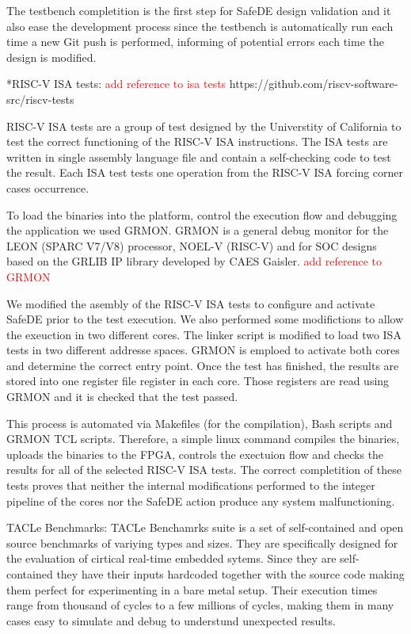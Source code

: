 The testbench completition is the first step for SafeDE design validation and it also ease the development process since the testbench is automatically run each time a new Git push is performed, informing of potential errors each time the design is modified.


*RISC-V ISA tests:
\textcolor{red}{add reference to isa tests} https://github.com/riscv-software-src/riscv-tests

RISC-V ISA tests are a group of test designed by the Universtity of California to test the correct functioning of the RISC-V ISA instructions. The ISA tests are written in single assembly language file and contain a self-checking code to test the result. Each ISA test tests one operation from the RISC-V ISA forcing corner cases occurrence. 

To load the binaries into the platform, control the execution flow and debugging the application we used GRMON. GRMON is a general debug monitor for the LEON (SPARC V7/V8) processor, NOEL-V (RISC-V) and for SOC designs based on the GRLIB IP library developed by CAES Gaisler. 
\textcolor{red}{add reference to GRMON} 

We modified the asembly of the RISC-V ISA tests to configure and activate SafeDE prior to the test execution. We also performed some modifictions to allow the exeuction in two different cores. The linker script is modified to load two ISA tests in two different addresse spaces. GRMON is emploed to activate both cores and determine the correct entry point. Once the test has finished, the results are stored into one register file register in each core. Those registers are read using GRMON and it is checked that the test passed. 

This process is automated via Makefiles (for the compilation), Bash scripts and GRMON TCL scripts. Therefore, a simple linux command compiles the binaries, uploads the binaries to the FPGA, controls the exectuion flow and checks the results for all of the selected RISC-V ISA tests. The correct completition of these tests proves that neither the internal modifications performed to the integer pipeline of the cores nor the SafeDE action produce any system malfunctioning.

TACLe Benchmarks:
TACLe Benchamrks suite is a set of self-contained and open source benchmarks of variying types and sizes. They are specifically designed for the evaluation of cirtical real-time embedded sytems. Since they are self-contained they have their inputs hardcoded together with the source code making them perfect for experimenting in a bare metal setup. Their execution times range from thousand of cycles to a few millions of cycles, making them in many cases easy to simulate and debug to understund unexpected results.

